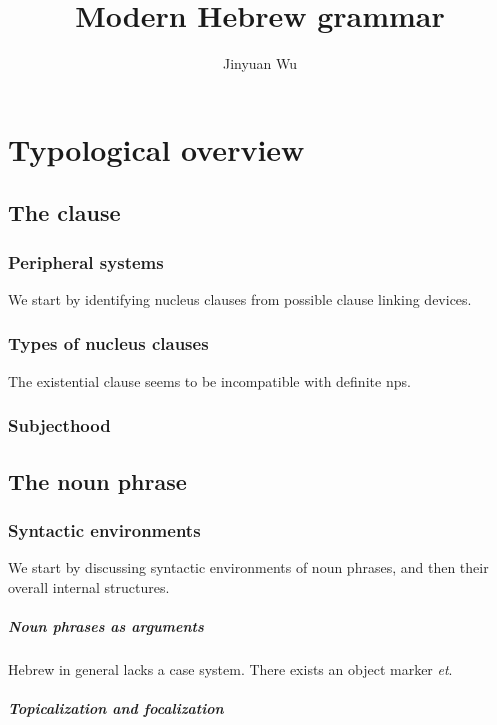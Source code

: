 \documentclass[a4paper, oneside, 12pt]{report}
\title{Modern Hebrew grammar}
\author{Jinyuan Wu}
\newcommand{\form}[1]{\emph{#1}}
\begin{document}
\maketitle

\automath

\chapter{Typological overview}

\section{The clause}

\subsection{Peripheral systems}

We start by identifying nucleus clauses from possible clause linking devices.


\subsection{Types of nucleus clauses}

The existential clause seems to be incompatible with definite \acp{np}.

\subsection{Subjecthood}


\section{The noun phrase}

\subsection{Syntactic environments}

We start by discussing syntactic environments of noun phrases,
and then their overall internal structures.

\paragraph*{Noun phrases as arguments}
Hebrew in general lacks a case system.
There exists an object marker \form{et}.

\paragraph*{Topicalization and focalization}
\end{document}
